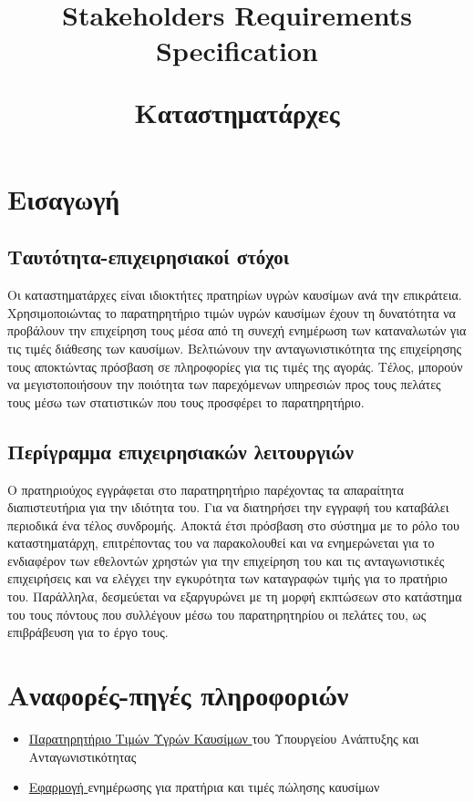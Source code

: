 \documentclass[a4paper,oneside, 12pt]{article}
\title{Stakeholders Requirements Specification\\
\begin{flushleft}
	Καταστηματάρχες
\end{flushleft}}
\date{\vspace{-5ex}}
\begin{document}
\maketitle
\section{Εισαγωγή}
\subsection{Ταυτότητα-επιχειρησιακοί στόχοι}

Οι καταστηματάρχες είναι ιδιοκτήτες πρατηρίων υγρών καυσίμων ανά την επικράτεια.
Χρησιμοποιώντας το παρατηρητήριο τιμών υγρών καυσίμων έχουν τη δυνατότητα να
προβάλουν την επιχείρηση τους μέσα από τη συνεχή ενημέρωση των καταναλωτών για
τις τιμές διάθεσης των καυσίμων. Βελτιώνουν την ανταγωνιστικότητα της επιχείρησης
τους αποκτώντας πρόσβαση σε πληροφορίες για τις τιμές της αγοράς. Τέλος, μπορούν
να μεγιστοποιήσουν την ποιότητα των παρεχόμενων υπηρεσιών προς τους πελάτες τους
μέσω των στατιστικών που τους προσφέρει το παρατηρητήριο.

\subsection{Περίγραμμα επιχειρησιακών λειτουργιών}

Ο πρατηριούχος εγγράφεται στο παρατηρητήριο παρέχοντας τα απαραίτητα
διαπιστευτήρια για την ιδιότητα του. Για να διατηρήσει την εγγραφή του καταβάλει
περιοδικά ένα τέλος συνδρομής. Αποκτά έτσι πρόσβαση στο σύστημα με το ρόλο του
καταστηματάρχη, επιτρέποντας του να παρακολουθεί και να ενημερώνεται για το
ενδιαφέρον των εθελοντών χρηστών για την επιχείρηση του και τις ανταγωνιστικές
επιχειρήσεις και να ελέγχει την εγκυρότητα των καταγραφών τιμής για το πρατήριο
του. Παράλληλα, δεσμεύεται να εξαργυρώνει με τη μορφή εκπτώσεων στο κατάστημα
του τους πόντους που συλλέγουν μέσω του παρατηρητηρίου οι πελάτες του, ως
επιβράβευση για το έργο τους.

\section{Αναφορές-πηγές πληροφοριών}

\begin{itemize}
		
	\item \href{http://www.fuelprices.gr/}{Παρατηρητήριο Τιμών Υγρών Καυσίμων }
	του Υπουργείου Ανάπτυξης και Ανταγωνιστικότητας
	
	\item \href{https://fuelgr.gr}{Εφαρμογή }
	ενημέρωσης για πρατήρια και τιμές πώλησης καυσίμων
	
	
\end{itemize}
\end{document}
